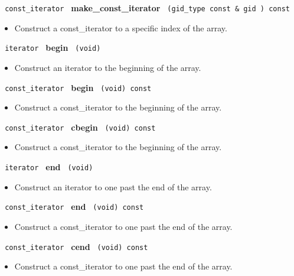 \noindent
\texttt{%
const\_iterator 
}
\textbf{make\_const\_iterator}%
\texttt{%
(gid\_type const \&
gid
) const
}

\begin{itemize}
\item
Construct a const\_iterator to a specific index of the array.
\end{itemize}
 
\noindent
\texttt{%
iterator
}
\textbf{begin}%
\texttt{%
(void)
}

\begin{itemize}
\item
Construct an iterator to the beginning of the array.
\end{itemize}
 
\noindent
\texttt{%
const\_iterator
}
\textbf{begin}%
\texttt{%
(void) const
}

\begin{itemize}
\item
Construct a const\_iterator to the beginning of the array.
\end{itemize}
 
\noindent
\texttt{%
const\_iterator
}
\textbf{cbegin}%
\texttt{%
(void) const
}

\begin{itemize}
\item
Construct a const\_iterator to the beginning of the array.
\end{itemize}
 
\noindent
\texttt{%
iterator
}
\textbf{end}%
\texttt{%
(void)
}

\begin{itemize}
\item
Construct an iterator to one past the end of the array.
\end{itemize}
 
\noindent
\texttt{%
const\_iterator
}
\textbf{end}%
\texttt{%
(void) const
}

\begin{itemize}
\item
Construct a const\_iterator to one past the end of the array.
\end{itemize}
 
\noindent
\texttt{%
const\_iterator
}
\textbf{cend}%
\texttt{%
(void) const
}

\begin{itemize}
\item
Construct a const\_iterator to one past the end of the array.
\end{itemize}
 
